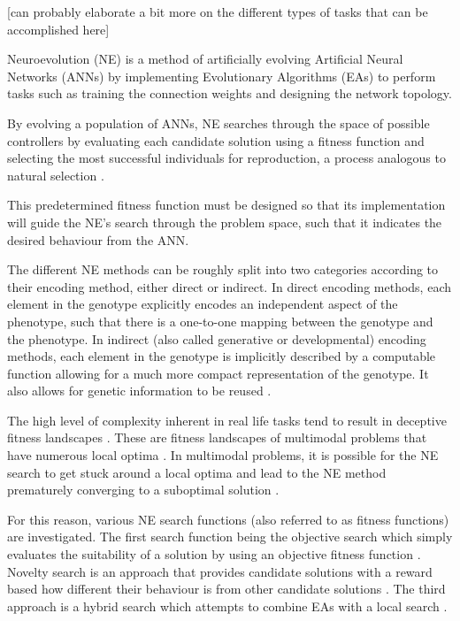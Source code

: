 [can probably elaborate a bit more on the different types of tasks that can be accomplished here]

Neuroevolution (NE) is a method of artificially evolving Artificial Neural Networks (ANNs) by implementing Evolutionary Algorithms (EAs) to perform tasks such as training the connection weights and designing the network topology\cite{RefWorks:31,RefWorks:1}.

By evolving a population of ANNs, NE searches through the space of possible controllers by evaluating each candidate solution using a fitness function and selecting the most successful individuals for reproduction, a process analogous to natural selection \cite{RefWorks:32,gomez2001neuro}.

This predetermined fitness function must be designed so that its implementation will guide the NE's search through the problem space, such that it indicates the desired behaviour from the ANN.

The different NE methods can be roughly split into two categories according to their encoding method, either direct or indirect. In direct encoding methods, each element in the genotype explicitly encodes an independent aspect of the phenotype, such that there is a one-to-one mapping between the genotype and the phenotype. In indirect (also called generative or developmental) encoding methods, each element in the genotype is implicitly described by a computable function allowing for a much more compact representation of the genotype. It also allows for genetic information to be reused \cite{clune2011performance,Stanley2003}.

The high level of complexity inherent in real life tasks tend to result in deceptive fitness landscapes \cite{RefWorks:11}. These are fitness landscapes of multimodal problems that have numerous local optima \cite{RefWorks:33}. In multimodal problems, it is possible for the NE search to get stuck around a local optima and lead to the NE method prematurely converging to a suboptimal solution \cite{RefWorks:11}.

For this reason, various NE search functions (also referred to as fitness functions) are investigated. The first search function being the objective search which simply evaluates the suitability of a solution by using an objective fitness function \cite{lehman2011abandoning}.
Novelty search is an approach that provides candidate solutions with a reward based how different their behaviour is from other candidate solutions \cite{RefWorks:11}. The third approach is a hybrid search which attempts to combine EAs with a local search \cite{Castillo2007}.

